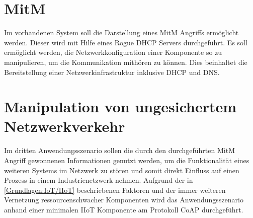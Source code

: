 \section{\ac{MitM}}
\label{Anwendungsszenarien:MitM}
Im vorhandenen System soll die Darstellung eines \ac{MitM} Angriffs ermöglicht werden. Dieser wird mit Hilfe eines Rogue \ac{DHCP} Servers durchgeführt. Es soll ermöglicht werden, die Netzwerkkonfiguration einer Komponente so zu manipulieren, um die Kommunikation mithören zu können. Dies beinhaltet die Bereitstellung einer Netzwerkinfrastruktur inklusive \ac{DHCP} und \ac{DNS}.

\section{Manipulation von ungesichertem Netzwerkverkehr}
\label{Anwendungsszenarien:Manipulation von ungesichertem Netzwerkverkehr}
Im dritten Anwendungsszenario sollen die durch den durchgeführten \ac{MitM} Angriff gewonnenen Informationen genutzt werden, um die Funktionalität eines weiteren Systems im Netzwerk zu stören und somit direkt Einfluss auf einen Prozess in einem Industrienetzwerk nehmen. Aufgrund der in \autoref{Grundlagen:IoT/IIoT} beschriebenen Faktoren und der immer weiteren Vernetzung ressourcenschwacher Komponenten wird das Anwendungsszenario anhand einer minimalen \ac{IIoT} Komponente am Protokoll \ac{CoAP} durchgeführt.